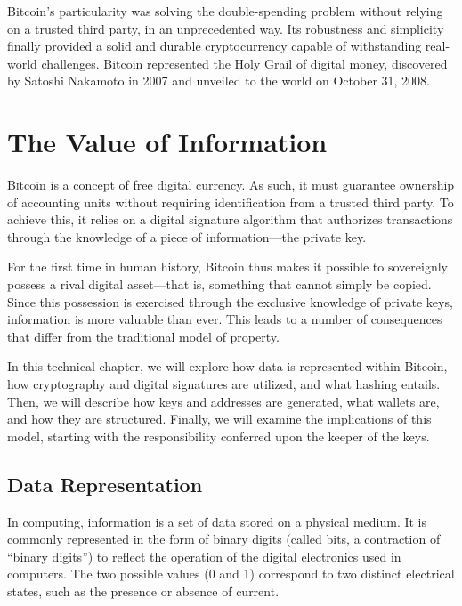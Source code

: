 \documentclass[
  a5paper,
  smalldemyvopaper,10pt,twoside,onecolumn,openright,extrafontsizes,hidelinks]{memoir}
\begin{document}
Bitcoin's particularity was solving the double-spending problem without
relying on a trusted third party, in an unprecedented way. Its
robustness and simplicity finally provided a solid and durable
cryptocurrency capable of withstanding real-world challenges. Bitcoin
represented the Holy Grail of digital money, discovered by Satoshi
Nakamoto in 2007 and unveiled to the world on October 31, 2008.


\chapter{The Value of Information}\label{ch:property}

\label{enotezch:7}{}

{B}\textsc{i}tcoin is a concept of free digital currency. As such, it
must guarantee ownership of accounting units without requiring
identification from a trusted third party. To achieve this, it relies on
a digital signature algorithm that authorizes transactions through the
knowledge of a piece of information---the private key.

For the first time in human history, Bitcoin thus makes it possible to
sovereignly possess a rival digital asset---that is, something that
cannot simply be copied. Since this possession is exercised through the
exclusive knowledge of private keys, information is more valuable than
ever. This leads to a number of consequences that differ from the
traditional model of property.

In this technical chapter, we will explore how data is represented
within Bitcoin, how cryptography and digital signatures are utilized,
and what hashing entails. Then, we will describe how keys and addresses
are generated, what wallets are, and how they are structured. Finally,
we will examine the implications of this model, starting with the
responsibility conferred upon the keeper of the keys.

\section*{Data Representation}\label{data-representation}


In computing, information is a set of data stored on a physical medium.
It is commonly represented in the form of binary digits (called bits, a
contraction of ``binary digits'') to reflect the operation of the
digital electronics used in computers. The two possible values (0 and 1)
correspond to two distinct electrical states, such as the presence or
absence of current.
\end{document}
